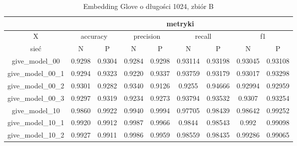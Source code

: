 \begin{table}[!h] \label{tab:wyniki_glove_B} \centering
    \caption{Embedding Glove o długości 1024, zbiór B}
    \begin{tabular} {|c|c|c|c|c|c|c|c|c| }    \hline
                                          & \multicolumn{8}{c|}{metryki}                                                                                                                                   \\ \hline
        X                                 & \multicolumn{2}{c|}{accuracy} & \multicolumn{2}{c|}{precision} & \multicolumn{2}{c|}{recall} & \multicolumn{2}{c|}{f1}                                         \\ \hline
        sieć                              & N                             & P                              & N                           & P                       & N       & P       & N       & P       \\ \hline
        give\_model\_00                   & 0.9298                        & 0.9304                         & 0.9284                      & 0.9298                  & 0.93114 & 0.93198 & 0.93045 & 0.93108 \\ \hline
        give\_model\_00\_1                & 0.9294                        & 0.9323                         & 0.9220                      & 0.9337                  & 0.93759 & 0.93179 & 0.93017 & 0.93298 \\ \hline
        give\_model\_00\_2                & 0.9301                        & 0.9282                         & 0.9340                      & 0.9126                  & 0.9255  & 0.94666 & 0.92994 & 0.92959 \\ \hline
        give\_model\_00\_3                & 0.9297                        & 0.9319                         & 0.9234                      & 0.9273                  & 0.93794 & 0.93532 & 0.9307  & 0.93254 \\ \hline
        give\_model\_10                   & 0.9860                        & 0.9922                         & 0.9940                      & 0.9994                  & 0.97705 & 0.98439 & 0.98642 & 0.99252 \\ \hline
        give\_model\_10\_1                & 0.9920                        & 0.9912                         & 0.9987                      & 0.9966                  & 0.9844  & 0.98543 & 0.992   & 0.99098 \\ \hline
        give\_model\_10\_2                & 0.9927                        & 0.9911                         & 0.9986                      & 0.9959                  & 0.98559 & 0.98435 & 0.99286 & 0.99065 \\ \hline

\end{tabular}
\end{table}
